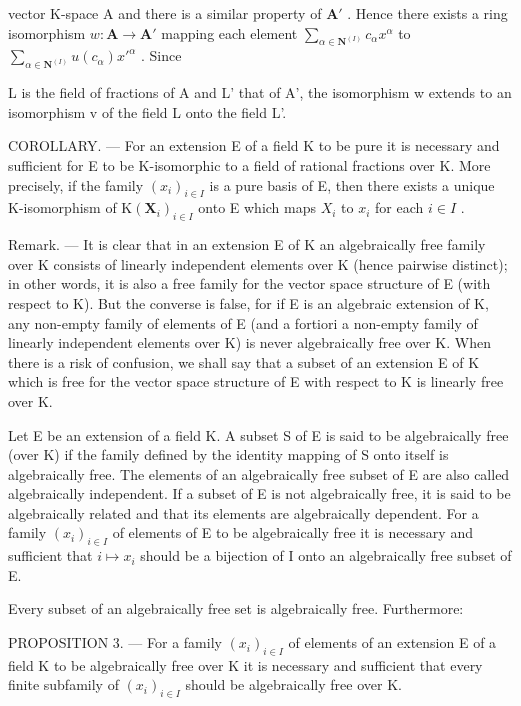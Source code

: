 vector K-space A and there is a similar property of \(\mathbf{A}'\) . Hence there exists a ring isomorphism \(w: \mathbf{A} \to \mathbf{A}'\) mapping each element \(\sum_{\alpha \in \mathbf{N}^{(I)}} c_{\alpha} x^{\alpha}\) to \(\sum_{\alpha \in \mathbf{N}^{(I)}} u(c_{\alpha}) x'^{\alpha}\) . Since

L is the field of fractions of A and L' that of A', the isomorphism w extends to an isomorphism v of the field L onto the field L'.

COROLLARY. --- For an extension E of a field K to be pure it is necessary and sufficient for E to be K-isomorphic to a field of rational fractions over K. More precisely, if the family \((x_{i})_{i\in I}\) is a pure basis of E, then there exists a unique K-isomorphism of \(\mathrm{K}(\mathbf{X}_{i})_{i\in I}\) onto E which maps \(X_{i}\) to \(x_{i}\) for each \(i\in I\) .

Remark. --- It is clear that in an extension E of K an algebraically free family over K consists of linearly independent elements over K (hence pairwise distinct); in other words, it is also a free family for the vector space structure of E (with respect to K). But the converse is false, for if E is an algebraic extension of K, any non-empty family of elements of E (and a fortiori a non-empty family of linearly independent elements over K) is never algebraically free over K. When there is a risk of confusion, we shall say that a subset of an extension E of K which is free for the vector space structure of E with respect to K is linearly free over K.

Let E be an extension of a field K. A subset S of E is said to be algebraically free (over K) if the family defined by the identity mapping of S onto itself is algebraically free. The elements of an algebraically free subset of E are also called algebraically independent. If a subset of E is not algebraically free, it is said to be algebraically related and that its elements are algebraically dependent. For a family \((x_{i})_{i\in I}\) of elements of E to be algebraically free it is necessary and sufficient that \(i\mapsto x_{i}\) should be a bijection of I onto an algebraically free subset of E.

Every subset of an algebraically free set is algebraically free. Furthermore:

PROPOSITION 3. --- For a family \((x_{i})_{i\in I}\) of elements of an extension E of a field K to be algebraically free over K it is necessary and sufficient that every finite subfamily of \((x_{i})_{i\in I}\) should be algebraically free over K.

